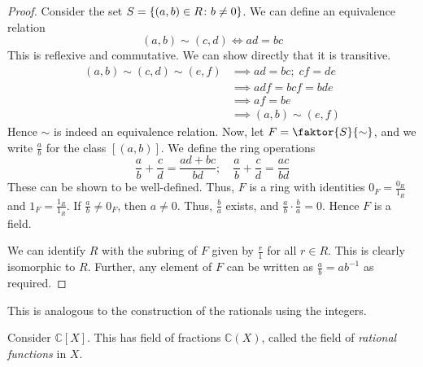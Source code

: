 \begin{proof}
	Consider the set \( S = \qty{(a,b) \in R \colon b \neq 0} \).
	We can define an equivalence relation
	\[ (a,b) \sim (c,d) \iff ad = bc \]
	This is reflexive and commutative.
	We can show directly that it is transitive.
	\begin{align*}
		(a,b) \sim (c,d) \sim (e,f) &\implies ad = bc;\; cf = de \\
		&\implies adf = bcf = bde \\
		&\implies af = be \\
		&\implies (a,b) \sim (e,f)
	\end{align*}
	Hence \( \sim \) is indeed an equivalence relation.
	Now, let \( F = \faktor{S}{\sim} \), and we write \( \frac{a}{b} \) for the class \( [(a,b)] \).
	We define the ring operations
	\[ \frac{a}{b} + \frac{c}{d} = \frac{ad + bc}{bd};\quad \frac{a}{b} + \frac{c}{d} = \frac{ac}{bd} \]
	These can be shown to be well-defined.
	Thus, \( F \) is a ring with identities \( 0_F = \frac{0_R}{1_R} \) and \( 1_F = \frac{1_R}{1_R} \).
	If \( \frac{a}{b} \neq 0_F \), then \( a \neq 0 \).
	Thus, \( \frac{b}{a} \) exists, and \( \frac{a}{b} \cdot \frac{b}{a} = 0 \).
	Hence \( F \) is a field.

	We can identify \( R \) with the subring of \( F \) given by \( \frac{r}{1} \) for all \( r \in R \).
	This is clearly isomorphic to \( R \).
	Further, any element of \( F \) can be written as \( \frac{a}{b} = ab^{-1} \) as required.
\end{proof}
This is analogous to the construction of the rationals using the integers.
\begin{example}
	Consider \( \mathbb C[X] \).
	This has field of fractions \( \mathbb C(X) \), called the field of \textit{rational functions} in \( X \).
\end{example}


